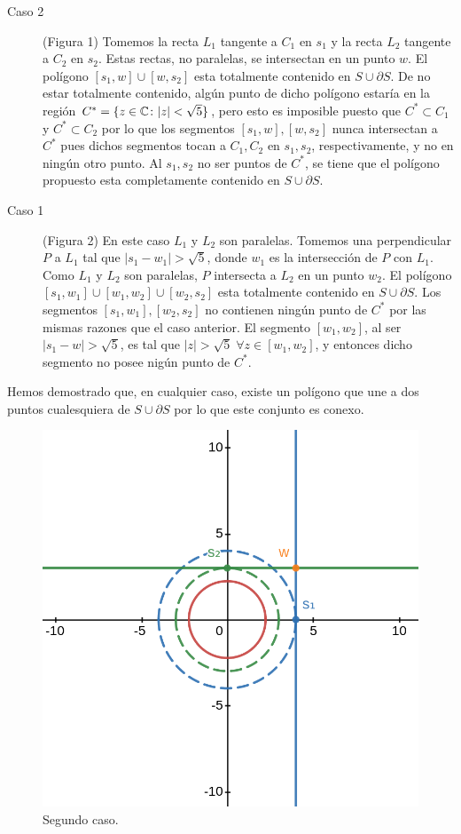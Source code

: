 \documentclass{scrartcl}
\begin{document}
\begin{description}
    \item[Caso 2] (Figura 1) Tomemos la recta $L_1$ tangente a $C_1$ en $s_1$ y la recta $L_2$ tangente a $C_2$ en $s_2$.
        Estas rectas, no paralelas, se intersectan en un punto $w$. El polígono $[s_1,w]\cup[w,s_2]$ esta totalmente
        contenido en $S\cup\partial S$. De no estar totalmente contenido, algún punto de dicho polígono estaría en la región
        $C^\ast = \{z\in\mathbb{C}\colon |z| < \sqrt{5}\}$, pero esto es imposible puesto que $C^\ast\subset C_1$ y $C^\ast\subset C_2$
        por lo que los segmentos $[s_1,w],[w,s_2]$ nunca intersectan a $C^\ast$ pues dichos segmentos tocan a $C_1,C_2$
        en $s_1,s_2$, respectivamente, y no en ningún otro punto. Al $s_1,s_2$ no ser puntos de $C^\ast$, se tiene que el
        polígono propuesto esta completamente contenido en $S\cup\partial S$.
    \item[Caso 1] (Figura 2) En este caso $L_1$ y $L_2$ son paralelas. Tomemos una perpendicular $P$ a $L_1$ tal que $|s_1-w_1| > \sqrt{5}$,
        donde $w_1$ es la intersección de $P$ con $L_1$. Como $L_1$ y $L_2$ son paralelas, $P$ intersecta a $L_2$ en un punto
        $w_2$. El polígono $[s_1,w_1]\cup[w_1,w_2]\cup[w_2,s_2]$ esta totalmente contenido en $S\cup\partial S$. Los segmentos
        $[s_1,w_1],[w_2,s_2]$ no contienen ningún punto de $C^\ast$ por las mismas razones que el caso anterior. El segmento
        $[w_1,w_2]$, al ser $|s_1-w| > \sqrt{5}$, es tal que $|z| > \sqrt{5}\;\forall z\in[w_1,w_2]$, y entonces dicho segmento
        no posee nigún punto de $C^\ast$.
\end{description}

Hemos demostrado que, en cualquier caso, existe un polígono que une a dos puntos cualesquiera de $S\cup\partial S$
por lo que este conjunto es conexo.

\begin{figure}
    \begin{center}
        \includegraphics[width=.65\textwidth]{caso2.png}
    \end{center}
    \caption{Segundo caso.}
\end{figure}
\end{document}
